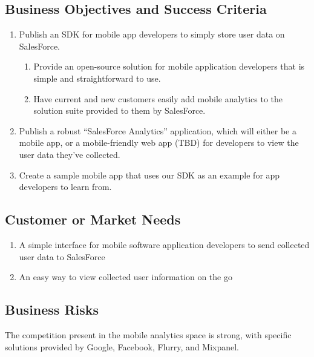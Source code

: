 \documentclass[12pt,oneside,letterpaper]{article}
\begin{document}
\subsection{Business Objectives and Success Criteria}
\begin{enumerate}[label = {\textbf{BOS-\arabic*}}, align = left, leftmargin = *, labelsep = 15pt]
\item Publish an SDK for mobile app developers to simply store user data on SalesForce.
    \begin{enumerate}[label = {\textbf{BOS-\arabic{enumi}.\arabic*}}, align = left, leftmargin = *, labelsep = 15pt]
    \item Provide an open-source solution for mobile application developers that is simple and straightforward to use.
    \item Have current and new customers easily add mobile analytics to the solution suite provided to them by SalesForce.
    \end{enumerate}
\item Publish a robust “SalesForce Analytics” application, which will either be a mobile app, or a mobile-friendly web app (TBD) for developers to view the user data they’ve collected. 
\item Create a sample mobile app that uses our SDK as an example for app developers to learn from.
\end{enumerate}

\subsection{Customer or Market Needs}
\begin{enumerate}[label = {\textbf{CN-\arabic*}}, align = left, leftmargin = *, labelsep = 15pt]
\item A simple interface for mobile software application developers to send collected user data to SalesForce
\item An easy way to view collected user information on the go
\end{enumerate}
\subsection{Business Risks}
The competition present in the mobile analytics space is strong, with specific solutions provided by Google, Facebook, Flurry, and Mixpanel. 
\newpage

\end{document}
